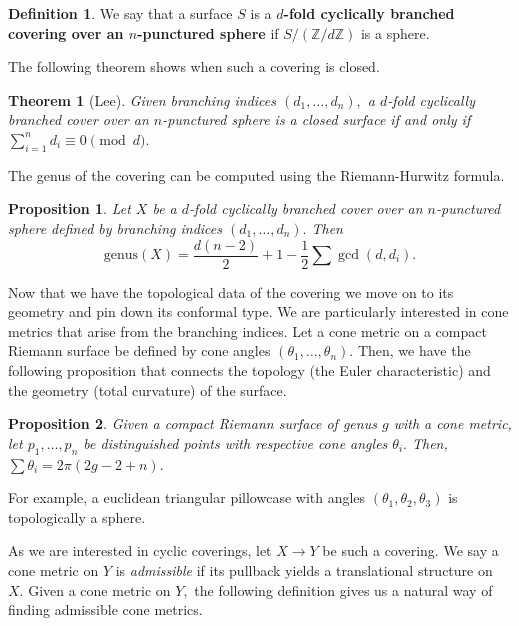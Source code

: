 \documentclass[12pt,reqno]{amsart}
\newtheorem*{thm*}{Theorem}
\newtheorem*{proposition}{Proposition}
\theoremstyle{definition}
\newtheorem{defn}{Definition}
\theoremstyle{remark}
\begin{document}

\begin{defn} We say that a surface $S$ is a \textbf{$d$-fold cyclically branched covering over an $n$-punctured sphere} if $S/(\mathbb{Z}/ d \mathbb{Z})$ is a sphere.  \end{defn}

The following theorem shows when such a covering is closed. 

\begin{thm*} [Lee] Given branching indices $(d_1, \ldots , d_n),$ a $d$-fold cyclically branched cover over an $n$-punctured sphere is a closed surface if and only if $\sum\limits_{i=1}^n d_i \equiv 0 \pmod d.$ 
\end{thm*}

The genus of the covering can be computed using the Riemann-Hurwitz formula.

\begin{proposition}
Let $X$ be a $d$-fold cyclically branched cover over an $n$-punctured sphere defined by branching indices $(d_1, \ldots , d_n).$ Then $$\textrm{genus}(X) = \frac{d (n - 2)}{2} + 1 - \frac{1}{2} \sum \gcd(d, d_i).$$ 
\end{proposition}

Now that we have the topological data of the covering we move on to its geometry and pin down its conformal type. We are particularly interested in cone metrics that arise from the branching indices. Let a cone metric on a compact Riemann surface be defined by cone angles $(\theta_1, \ldots , \theta_n).$ Then, we have the following proposition that connects the topology (the Euler characteristic) and the geometry (total curvature) of the surface. 

\begin{proposition}
Given a compact Riemann surface of genus $g$ with a cone metric, let $p_1, \ldots , p_n$ be distinguished points with respective cone angles $\theta_i.$ Then, $\sum \theta_i = 2 \pi (2 g - 2 + n).$
\end{proposition}

For example, a euclidean triangular pillowcase with angles $(\theta_1, \theta_2, \theta_3)$ is topologically a sphere. 

As we are interested in cyclic coverings, let $X \rightarrow Y$ be such a covering. We say a cone metric on $Y$ is \textit{admissible} if its pullback yields a translational structure on $X.$ Given a cone metric on $Y,$ the following definition gives us a natural way of finding admissible cone metrics. 
\end{document}

